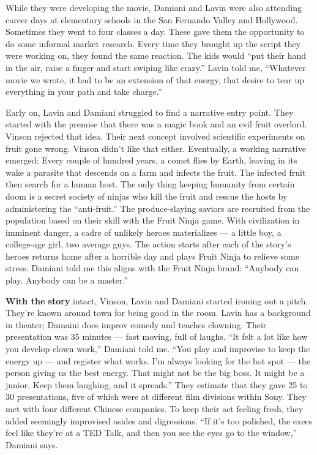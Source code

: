 While they were developing the movie, Damiani and Lavin were also
attending career days at elementary schools in the San Fernando Valley
and Hollywood. Sometimes they went to four classes a day. These gave
them the opportunity to do some informal market research. Every time
they brought up the script they were working on, they found the same
reaction. The kids would ``put their hand in the air, raise a finger and
start swiping like crazy.'' Lavin told me, ``Whatever movie we wrote, it
had to be an extension of that energy, that desire to tear up everything
in your path and take charge.''

Early on, Lavin and Damiani struggled to find a narrative entry point.
They started with the premise that there was a magic book and an evil
fruit overlord. Vinson rejected that idea. Their next concept involved
scientific experiments on fruit gone wrong. Vinson didn't like that
either. Eventually, a working narrative emerged: Every couple of hundred
years, a comet flies by Earth, leaving in its wake a parasite that
descends on a farm and infects the fruit. The infected fruit then search
for a human host. The only thing keeping humanity from certain doom is a
secret society of ninjas who kill the fruit and rescue the hosts by
administering the ``anti-­fruit.'' The produce-­slaying saviors are
recruited from the population based on their skill with the Fruit Ninja
game. With civilization in imminent danger, a cadre of unlikely heroes
materializes --- a little boy, a college-­age girl, two average guys.
The action starts after each of the story's heroes returns home after a
horrible day and plays Fruit Ninja to relieve some stress. Damiani told
me this aligns with the Fruit Ninja brand: ``Anybody can play. Anybody
can be a master.''

\textbf{With the story} intact, Vinson, Lavin and Damiani started
ironing out a pitch. They're known around town for being good in the
room. Lavin has a background in theater; Damaini does improv comedy and
teaches clowning. Their presentation was 35 minutes --- fast moving,
full of laughs. ``It felt a lot like how you develop clown work,''
Damiani told me. ``You play and improvise to keep the energy up --- and
register what works. I'm always looking for the hot spot --- the person
giving us the best energy. That might not be the big boss. It might be a
junior. Keep them laughing, and it spreads.'' They estimate that they
gave 25 to 30 presentations, five of which were at different film
divisions within Sony. They met with four different Chinese companies.
To keep their act feeling fresh, they added seemingly improvised asides
and digressions. ``If it's too polished, the execs feel like they're at
a TED Talk, and then you see the eyes go to the window,'' Damiani says.

